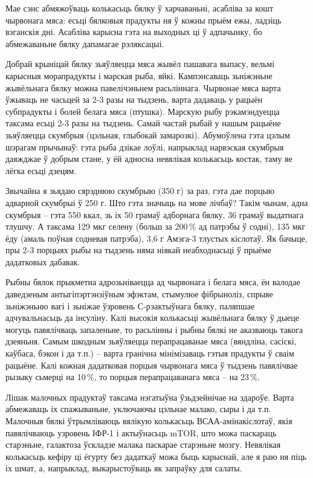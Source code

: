 Мае сэнс абмяжоўваць колькасьць бялку ў харчаваньні, асабліва за кошт чырвонага мяса: есьці бялковыя прадукты ня ў кожны прыём ежы, ладзіць вэганскія дні. Асабліва карысна гэта на выходных ці ў адпачынку, бо абмежаваньне бялку дапамагае рэляксацыі.

Добрай крыніцай бялку зьяўляецца мяса жывёл пашавага выпасу, вельмі карысныя морапрадукты і марская рыба, яйкі. Кампэнсаваць зьніжэньне жывёльнага бялку можна павелічэньнем расьліннага. Чырвонае мяса варта ўжываць не часьцей за 2-3 разы на тыдзень, варта дадаваць у рацыён субпрадукты і болей белага мяса (птушка). Марскую рыбу рэкамэндуецца таксама есьці 2-3 разы на тыдзень. Самай частай рыбай у нашым рацыёне зьяўляецца скумбрыя (цэльная, глыбокай замарозкі). Абумоўлена гэта цэлым шэрагам прычынаў: гэта рыба дзікае лоўлі, напрыклад нарвэская скумбрыя даяжджае ў добрым стане, у ёй адносна невялікая колькасьць костак, таму яе лёгка есьці дзецям.

Звычайна я зьядаю сярэднюю скумбрыю (350 г) за раз, гэта дае порцыю адварной скумбрыі ў 250 г. Што гэта значыць на мове лічбаў? Такім чынам, адна скумбрыя – гэта 550 ккал, зь іх 50 грамаў адборнага бялку, 36 грамаў выдатнага тлушчу. А таксама 129 мкг селену (больш за 200\,\% ад патрэбы ў содні), 135 мкг ёду (амаль поўная содневая патрэба), 3,6 г Амэга-3 тлустых кіслотаў. Як бачыце, пры 2-3 порцыях рыбы на тыдзень няма ніякай неабходнасьці ў прыёме дадатковых дабавак.

Рыбны бялок прыкметна адрозьніваецца ад чырвонага і белага мяса, ён валодае даведзеным антыгіпэртэнзіўным эфэктам, стымулюе фібрыноліз, спрыяе зьніжэньню вагі і зьніжае ўзровень С-рэактыўнага бялку, паляпшае адчувальнасьць да інсуліну. Калі высокія колькасьці жывёльнага бялку ў дыеце могуць павялічваць запаленьне, то расьлінны і рыбны бялкі не аказваюць такога дзеяньня. Самым шкодным зьяўляецца перапрацаванае мяса (вяндліна, сасіскі, каўбаса, бэкон і да т.п.) – варта гранічна мінімізаваць гэтыя прадукты ў сваім рацыёне. Калі кожная дадатковая порцыя чырвонага мяса ў тыдзень павялічвае рызыку сьмерці на 10\,\%, то порцыя перапрацаванага мяса – на 23\,\%.

Лішак малочных прадуктаў таксама нэгатыўна ўзьдзейнічае на здароўе. Варта абмежаваць іх спажываньне, уключаючы цэльнае малако, сыры і да т.п. Малочныя бялкі ўтрымліваюць вялікую колькасьць ВСАА-амінакіслотаў, якія павялічваюць узровень ІФР-1 і актыўнасьць mTOR, што можа паскараць старэньне, галактоза ўскладзе малака паскарае старэньне мозгу. Невялікая колькасьць кефіру ці ёгурту без дадаткаў можа быць карыснай, але я раю ня піць іх шмат, а, напрыклад, выкарыстоўваць як запраўку для салаты.


